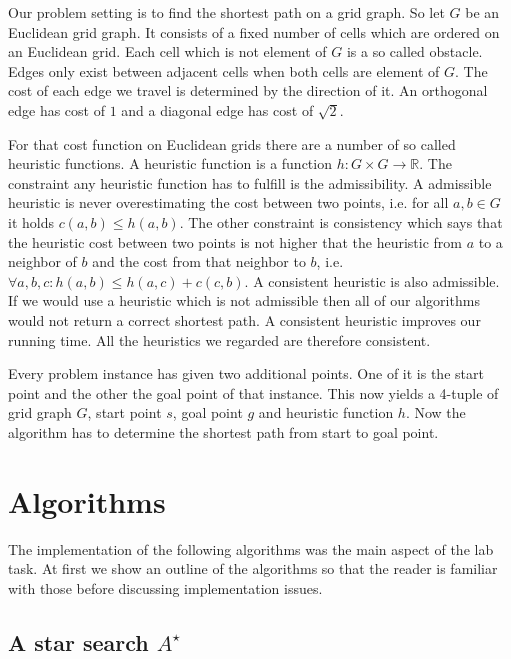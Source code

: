 \documentclass{article}
\begin{document}
    Our problem setting is to find the shortest path on a grid graph. So let $G$ be an Euclidean grid graph. It consists of a fixed number of cells which are ordered on an Euclidean grid. Each cell which is not element of $G$ is a so called obstacle. Edges only exist between adjacent cells when both cells are element of $G$. The cost of each edge we travel is determined by the direction of it. An orthogonal edge has cost of $1$ and a diagonal edge has cost of $\sqrt{2}$.
    
    For that cost function on Euclidean grids there are a number of so called heuristic functions. A heuristic function is a function $h : G \times G \rightarrow \mathbb{R}$. The constraint any heuristic function has to fulfill is the admissibility. A admissible heuristic is never overestimating the cost between two points, i.e. for all $a, b \in G$ it holds $c(a, b) \leq h(a,b)$. The other constraint is consistency which says that the heuristic cost between two points is not higher that the heuristic from $a$ to a neighbor of $b$ and the cost from that neighbor to $b$, i.e. $\forall a, b, c: h(a, b) \leq h(a, c) + c(c, b)$. A consistent heuristic is also admissible. If we would use a heuristic which is not admissible then all of our algorithms would not return a correct shortest path. A consistent heuristic improves our running time. All the heuristics we regarded are therefore consistent.
    
    Every problem instance has given two additional points. One of it is the start point and the other the goal point of that instance. This now yields a 4-tuple of grid graph $G$, start point $s$, goal point $g$ and heuristic function $h$. Now the algorithm has to determine the shortest path from start to goal point.\cite{DBLP:conf/aaai/HaraborG11}
    
    
    
    \section{Algorithms}
    \label{sec:algorithms}
    
    The implementation of the following algorithms was the main aspect of the lab task. At first we show an outline of the algorithms so that the reader is familiar with those before discussing implementation issues.
    
    \subsection{A star search $A^\star$ }
    
\end{document}
